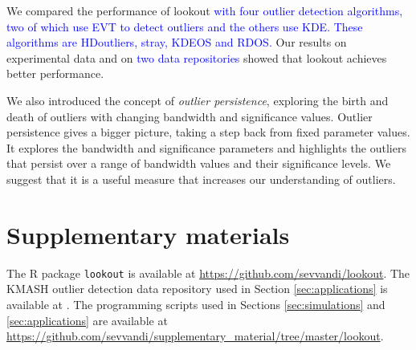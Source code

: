 \documentclass[12pt]{article}
\theoremstyle{definition}
\theoremstyle{definition}
\theoremstyle{definition}
\theoremstyle{definition}
\theoremstyle{remark}
\begin{document}
We compared the performance of lookout \textcolor{blue}{with four outlier detection algorithms, two of which use EVT to detect outliers and the others use KDE. These algorithms are HDoutliers, stray, KDEOS and RDOS.} Our results on experimental data and on \textcolor{blue}{two data repositories} showed that lookout achieves better performance.

We also introduced the concept of \emph{outlier persistence}, exploring the birth and death of outliers with changing bandwidth and significance values. Outlier persistence gives a bigger picture, taking a step back from fixed parameter values. It explores the bandwidth and significance parameters and highlights the outliers that persist over a range of bandwidth values and their significance levels. We suggest that it is a useful measure that increases our understanding of outliers.

\hypertarget{sec:suppmat}{%
\section{Supplementary materials}\label{sec:suppmat}}

The R package \texttt{lookout} is available at \url{https://github.com/sevvandi/lookout}.
The KMASH outlier detection data repository used in Section \ref{sec:applications} is available at \citet{datasets}.
The programming scripts used in Sections \ref{sec:simulations} and \ref{sec:applications} are available at \url{https://github.com/sevvandi/supplementary_material/tree/master/lookout}.



\end{document}
